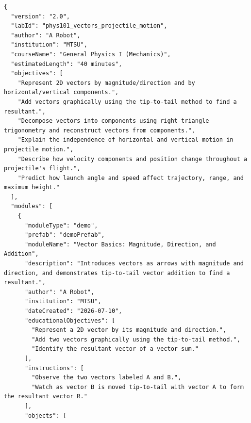 %

\begin{lstlisting}[style=arlemlisting, caption={The JSON Lab wrapper and the opening of the first module, from Claude Sonnet~5's \emph{Vectors and Projectile Motion} lab. The lab object carries course-level metadata and objectives; each module declares its own scene objects and the clips that animate them.}, label={lst:json-lab-snippet}]
{
  "version": "2.0",
  "labId": "phys101_vectors_projectile_motion",
  "author": "A Robot",
  "institution": "MTSU",
  "courseName": "General Physics I (Mechanics)",
  "estimatedLength": "40 minutes",
  "objectives": [
    "Represent 2D vectors by magnitude/direction and by horizontal/vertical components.",
    "Add vectors graphically using the tip-to-tail method to find a resultant.",
    "Decompose vectors into components using right-triangle trigonometry and reconstruct vectors from components.",
    "Explain the independence of horizontal and vertical motion in projectile motion.",
    "Describe how velocity components and position change throughout a projectile's flight.",
    "Predict how launch angle and speed affect trajectory, range, and maximum height."
  ],
  "modules": [
    {
      "moduleType": "demo",
      "prefab": "demoPrefab",
      "moduleName": "Vector Basics: Magnitude, Direction, and Addition",
      "description": "Introduces vectors as arrows with magnitude and direction, and demonstrates tip-to-tail vector addition to find a resultant.",
      "author": "A Robot",
      "institution": "MTSU",
      "dateCreated": "2026-07-10",
      "educationalObjectives": [
        "Represent a 2D vector by its magnitude and direction.",
        "Add two vectors graphically using the tip-to-tail method.",
        "Identify the resultant vector of a vector sum."
      ],
      "instructions": [
        "Observe the two vectors labeled A and B.",
        "Watch as vector B is moved tip-to-tail with vector A to form the resultant vector R."
      ],
      "objects": [

\end{lstlisting}
